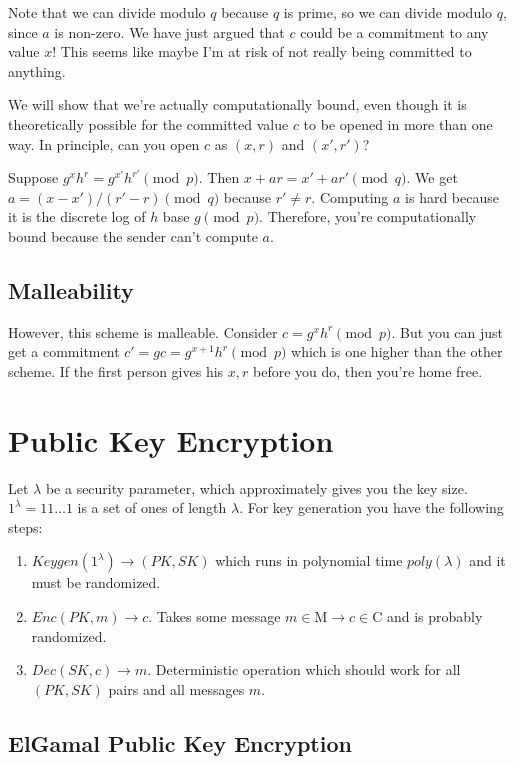 \documentclass[psamsfonts]{amsart}
\begin{document}
Note that we can divide modulo $q$ because $q$ is prime, so we can divide modulo $q$, since $a$ is non-zero. We have just argued that $c$ could be a commitment to any value $x$! This seems like maybe I'm at risk of not really being committed to anything.

We will show that we're actually computationally bound, even though it is theoretically possible for the committed value $c$ to be opened in more than one way. In principle, can you open $c$ as $(x,r)$ and $(x', r')$?

Suppose $g^x h^r = g^{x'} h^{r'} \pmod{p}$. Then $x + ar = x' + ar' \pmod{q}$. We get $a = (x - x')/(r' - r) \pmod{q}$ because $r' \neq r$. Computing $a$ is hard because it is the discrete log of $h$ base $g \pmod{p}$. Therefore, you're computationally bound because the sender can't compute $a$. 

\subsection{Malleability}

However, this scheme is malleable. Consider $c = g^x h^r \pmod{p}$. But you can just get a commitment $c' = g c = g^{x+1} h^r \pmod{p}$ which is one higher than the other scheme. If the first person gives his $x,r$ before you do, then you're home free.

\section{Public Key Encryption}

Let $\lambda$ be a security parameter, which approximately gives you the key size. $1^{\lambda} = 1 1 \ldots 1$ is a set of ones of length $\lambda$. For key generation you have the following steps:

\begin{enumerate}
  \item $Keygen(1^{\lambda}) \to (PK, SK)$ which runs in polynomial time $poly(\lambda)$ and it must be randomized.
  \item $Enc(PK, m) \to c$. Takes some message $m \in \mathrm{M} \to c \in \mathrm{C}$ and is probably randomized.
  \item $Dec(SK, c) \to m$. Deterministic operation which should work for all $(PK, SK)$ pairs and all messages $m$. 
\end{enumerate}

\subsection{ElGamal Public Key Encryption}
\end{document}
